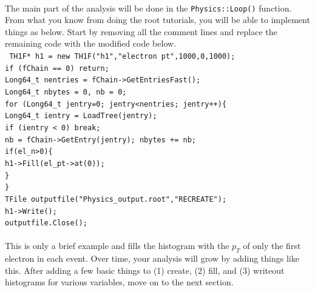 \documentclass[12pt]{article}
\begin{document}
\\
The main part of the analysis will be done in the \texttt{Physics::Loop()} function.  From what you know from doing the root tutorials, you will be able to implement things as below.  Start by removing all the comment lines and replace the remaining code with the modified code below.  \\
\texttt{
\hspace*{0.0cm}TH1F* h1 = new TH1F("h1","electron pt",1000,0,1000);\\
\hspace*{0.0cm}if (fChain == 0) return;\\
\hspace*{0.0cm}Long64\_t nentries = fChain->GetEntriesFast();\\
\hspace*{0.0cm}Long64\_t nbytes = 0, nb = 0;\\
\hspace*{0.0cm}for (Long64\_t jentry=0; jentry<nentries; jentry++)\{\\
\hspace*{0.4cm}   Long64\_t ientry = LoadTree(jentry);\\
\hspace*{0.4cm}   if (ientry < 0) break;\\
\hspace*{0.4cm}   nb = fChain->GetEntry(jentry);   nbytes += nb;\\
\hspace*{0.4cm}   if(el\_n>0)\{\\
\hspace*{0.8cm}	     h1->Fill(el\_pt->at(0));\\
\hspace*{0.4cm}   \}\\
\hspace*{0.0cm}\}\\
\hspace*{0.0cm}TFile outputfile("Physics\_output.root","RECREATE");\\
\hspace*{0.0cm}h1->Write();\\
\hspace*{0.0cm}outputfile.Close();\\
}
\\
This is only a brief example and fills the histogram with the $p_{T}$ of only the first electron in each event.  Over time, your analysis will grow by adding things like this.  After adding a few basic things to (1) create, (2) fill, and (3) writeout histograms for various variables, move on to the next section.\\
\end{document}
